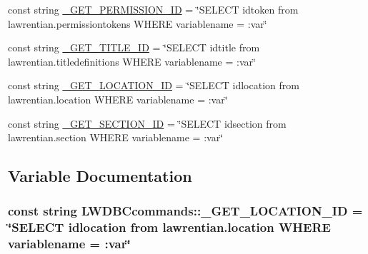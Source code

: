 \begin{DoxyCompactItemize}
\item 
const string \hyperlink{namespace_l_w_d_b_ccommands_aa6c28877fcb0b957733838a203649cd4}{\+\_\+\+G\+E\+T\+\_\+\+P\+E\+R\+M\+I\+S\+S\+I\+O\+N\+\_\+\+I\+D} = \char`\"{}S\+E\+L\+E\+C\+T idtoken from lawrentian.\+permissiontokens W\+H\+E\+R\+E variablename = \+:var\char`\"{}
\item 
const string \hyperlink{namespace_l_w_d_b_ccommands_a2b95e41044f72b14f707b30773f2ece5}{\+\_\+\+G\+E\+T\+\_\+\+T\+I\+T\+L\+E\+\_\+\+I\+D} = \char`\"{}S\+E\+L\+E\+C\+T idtitle from lawrentian.\+titledefinitions W\+H\+E\+R\+E variablename = \+:var\char`\"{}
\item 
const string \hyperlink{namespace_l_w_d_b_ccommands_add36a05562a3745c2955ae38e3aea765}{\+\_\+\+G\+E\+T\+\_\+\+L\+O\+C\+A\+T\+I\+O\+N\+\_\+\+I\+D} = \char`\"{}S\+E\+L\+E\+C\+T idlocation from lawrentian.\+location W\+H\+E\+R\+E variablename = \+:var\char`\"{}
\item 
const string \hyperlink{namespace_l_w_d_b_ccommands_ada31170d76bb541174b8c40d8d019cca}{\+\_\+\+G\+E\+T\+\_\+\+S\+E\+C\+T\+I\+O\+N\+\_\+\+I\+D} = \char`\"{}S\+E\+L\+E\+C\+T idsection from lawrentian.\+section W\+H\+E\+R\+E variablename = \+:var\char`\"{}
\end{DoxyCompactItemize}


\subsection{Variable Documentation}
\hypertarget{namespace_l_w_d_b_ccommands_add36a05562a3745c2955ae38e3aea765}{}
\subsubsection[{\+\_\+\+G\+E\+T\+\_\+\+L\+O\+C\+A\+T\+I\+O\+N\+\_\+\+I\+D}]{\setlength{\rightskip}{0pt plus 5cm}const string L\+W\+D\+B\+Ccommands\+::\+\_\+\+G\+E\+T\+\_\+\+L\+O\+C\+A\+T\+I\+O\+N\+\_\+\+I\+D = \char`\"{}S\+E\+L\+E\+C\+T idlocation from lawrentian.\+location W\+H\+E\+R\+E variablename = \+:var\char`\"{}}\label{namespace_l_w_d_b_ccommands_add36a05562a3745c2955ae38e3aea765}
\hypertarget{namespace_l_w_d_b_ccommands_aa6c28877fcb0b957733838a203649cd4}{}
